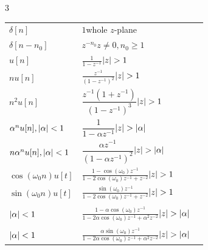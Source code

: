 \documentclass[10pt,landscape]{article}
\begin{document}
\begin{multicols}{3}
{\begin{tabularx}{\columnwidth}{l X X}
    
    $\delta[n]$ &
    $1$\hfill whole $z$-plane \\[10pt]
    
    $\delta[n-n_0]$ &
    $z^{-n_0}$\hfill $z\ne0,n_0\ge1$ \\[10pt]

    $u[n]$&
    $\displaystyle \frac{1}{1-z^{-1}}$\hfill $\abs{z}>1$  \\[10pt]
    
    $nu[n]$ &
    $\displaystyle\frac{z^{-1}}{(1-z^{-1})^2}$\hfill $\abs{z}>1$   \\[10pt]
    
    $n^2u[n]$ &
    $\dfrac{z^{-1}(1+z^{-1})}{(1-z^{-1})^3}$\hfill $\abs{z}>1$  \\[10pt]
    
    $\alpha^nu[n], \abs{\alpha}<1$ &$\dfrac{1}{1-\alpha z^{-1}}$\hfill $\abs{z}>\abs{\alpha}$ \\[10pt]
    
    $n\alpha^nu[n], \abs{\alpha}<1$ &$\dfrac{\alpha z^{-1}}{(1-\alpha z^{-1})^2}$\hfill $\abs{z}>\abs{\alpha}$ \\[10pt]
    
    $\cos(\omega_0 n)u[t]$ &
    $\displaystyle\frac{1-\cos(\omega_0)z^{-1}}{1-2\cos (\omega_0)z^{-1}+z^{-2}}$\hfill $\abs{z} >1$ \\[10pt]
    
    $\sin(\omega_0 n)u[t]$ &
    $\displaystyle\frac{\sin(\omega_0)z^{-1}}{1-2\cos (\omega_0)z^{-1}+z^{-2}}$\hfill $\abs{z} >1$ \\[10pt]
    
    \begin{tabular}{@{} l}
    $\alpha^n\cos(\omega_0 n)u[t]$ \\[1pt]
    \qquad $\abs{\alpha}<1$
    \end{tabular}&
    $\displaystyle\frac{1-\alpha\cos(\omega_0)z^{-1}}{1-2\alpha\cos (\omega_0)z^{-1}+\alpha^2z^{-2}}$\hfill $\abs{z} >\abs{\alpha}$ \\[10pt]
    
    
    \begin{tabular}{@{} l}
    $\alpha^n\sin(\omega_0 n)u[t]$ \\[1pt]
    \qquad $\abs{\alpha}<1$
    \end{tabular}&
    $\displaystyle\frac{\alpha\sin(\omega_0)z^{-1}}{1-2\alpha\cos (\omega_0)z^{-1}+\alpha^2z^{-2}}$\hfill $\abs{z} >\abs{\alpha}$ \\[10pt]
    
    \end{tabularx}}
    

\end{multicols}
\end{document}
